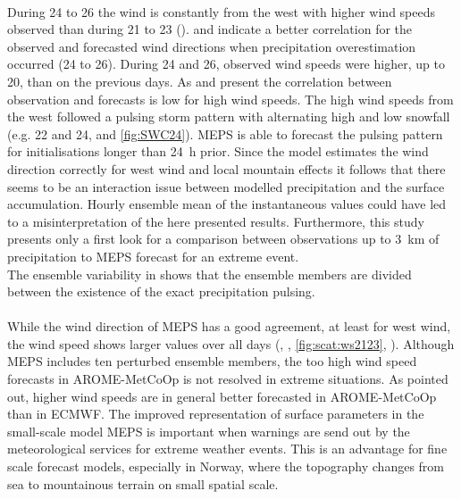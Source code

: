 \\
During \num{24} to \SI{26}{\dec} the wind is constantly from the west with higher wind speeds observed than during \num{21} to \SI{23}{\dec} ().  and  indicate a better correlation for the observed and forecasted wind directions when precipitation overestimation occurred (\num{24} to \SI{26}{\dec}). During \num{24} and \SI{26}{\dec}, observed wind speeds were higher, up to \SI{20}{\mPs}, than on the previous days. As  and  present the correlation between observation and forecasts is low for high wind speeds. The high wind speeds from the west followed a pulsing storm pattern with alternating high and low snowfall (e.g. \num{22} and \SI{24}{\dec},  and \ref{fig:SWC24}). MEPS is able to forecast the pulsing pattern for initialisations longer than \SI{24}{\hour} prior. Since the model estimates the wind direction correctly for west wind and local mountain effects it follows that there seems to be an interaction issue between modelled precipitation and the surface accumulation. Hourly ensemble mean of the instantaneous values could
have led to a misinterpretation of the here presented results. Furthermore, this study presents only a first look for a comparison between observations up to \SI{3}{\km} of precipitation to MEPS forecast for an extreme event. 
\\
The ensemble variability in  shows that the ensemble members are divided between the existence of the exact precipitation pulsing. 
\\
\\
While the wind direction of MEPS has a good agreement, at least for west wind, the wind speed shows larger values over all days (, , \ref{fig:scat:ws2123}, ). Although MEPS includes ten perturbed ensemble members, %
the too high wind speed forecasts in AROME-MetCoOp is not resolved in extreme situations. %
As \cite{muller_arome-metcoop:_2017} pointed out, higher wind speeds are in general better forecasted in AROME-MetCoOp than in ECMWF. %
The improved representation of surface parameters in the small-scale model MEPS is important when warnings are send out by the meteorological services for extreme weather events.
This is an advantage for fine scale forecast models, especially in Norway, where the topography changes from sea to mountainous terrain on small spatial scale.


